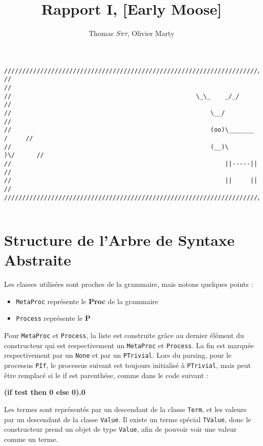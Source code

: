 \documentclass[11pt]{article} %
\title{Rapport I,  [Early Moose]}
\author{Thomas $S\pi\tau$, Olivier Marty}
\begin{document}
\maketitle

\begin{verbatim}
////////////////////////////////////////////////////////////////////////////////
//                                                                            //
//                                                   \_\_    _/_/             //
//                                                       \__/                 //
//                                                       (oo)\_______   /     //
//                                                       (__)\       )\/      //
//                                                           ||-----||        //
//                                                           ||     ||        //
////////////////////////////////////////////////////////////////////////////////  


\end{verbatim}
\section{Structure de l'Arbre de Syntaxe Abstraite}

Les classes utilisées sont proches de la grammaire, mais notons quelques points :
\begin{itemize}
 \item  \texttt{MetaProc} représente le \textbf{Proc} de la grammaire
 \item  \texttt{Process} représente le \textbf{P}
\end{itemize}

Pour \texttt{MetaProc} et \texttt{Process}, la liste est construite grâce au dernier élément du constructeur qui est respectivement un \texttt{MetaProc} et \texttt{Process}. La fin est marquée respectivement par un \texttt{None} et par un \texttt{PTrivial}.
Lors du parsing, pour le processus \texttt{PIf}, le processus suivant est toujours initialisé à \texttt{PTrivial}, mais peut être remplacé si le if est parenthése, comme dans le code suivant :
\begin{center}
 \textbf{(if test then 0 else 0).0}
\end{center}

Les termes sont représentés par un descendant de la classe \texttt{Term}, et les valeurs par un descendant de la classe \texttt{Value}. Il existe un terme spécial \texttt{TValue}, donc le constructeur prend un objet de type \texttt{Value}, afin de pouvoir voir une valeur comme un terme.
\end{document}
